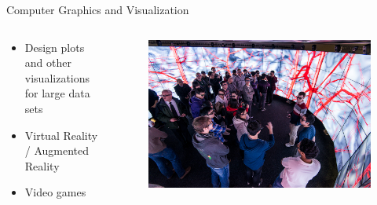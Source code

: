 \documentclass{beamer}
\begin{document}
\begin{frame}{Computer Graphics and Visualization}
\begin{columns}
	\begin{column}{.40\textwidth}
		\begin{itemize}
			\item Design plots and other visualizations for large data sets
			\item Virtual Reality / Augmented Reality
			\item Video games
		\end{itemize}
	\end{column}
	\begin{column}{.60\textwidth}
		\begin{figure}
			\includegraphics[width=\linewidth]{img/vis.jpg}
		\end{figure}
	\end{column}
\end{columns}
\end{frame}
\end{document}
